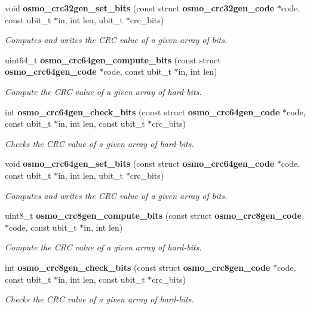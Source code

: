 \begin{DoxyCompactItemize}
void {\bf osmo\_\-crc32gen\_\-set\_\-bits} (const struct {\bf osmo\_\-crc32gen\_\-code} $\ast$code, const ubit\_\-t $\ast$in, int len, ubit\_\-t $\ast$crc\_\-bits)
\begin{DoxyCompactList}\small\item\em Computes and writes the CRC value of a given array of bits. \item\end{DoxyCompactList}\item 
uint64\_\-t {\bf osmo\_\-crc64gen\_\-compute\_\-bits} (const struct {\bf osmo\_\-crc64gen\_\-code} $\ast$code, const ubit\_\-t $\ast$in, int len)
\begin{DoxyCompactList}\small\item\em Compute the CRC value of a given array of hard-\/bits. \item\end{DoxyCompactList}\item 
int {\bf osmo\_\-crc64gen\_\-check\_\-bits} (const struct {\bf osmo\_\-crc64gen\_\-code} $\ast$code, const ubit\_\-t $\ast$in, int len, const ubit\_\-t $\ast$crc\_\-bits)
\begin{DoxyCompactList}\small\item\em Checks the CRC value of a given array of hard-\/bits. \item\end{DoxyCompactList}\item 
void {\bf osmo\_\-crc64gen\_\-set\_\-bits} (const struct {\bf osmo\_\-crc64gen\_\-code} $\ast$code, const ubit\_\-t $\ast$in, int len, ubit\_\-t $\ast$crc\_\-bits)
\begin{DoxyCompactList}\small\item\em Computes and writes the CRC value of a given array of bits. \item\end{DoxyCompactList}\item 
uint8\_\-t {\bf osmo\_\-crc8gen\_\-compute\_\-bits} (const struct {\bf osmo\_\-crc8gen\_\-code} $\ast$code, const ubit\_\-t $\ast$in, int len)
\begin{DoxyCompactList}\small\item\em Compute the CRC value of a given array of hard-\/bits. \item\end{DoxyCompactList}\item 
int {\bf osmo\_\-crc8gen\_\-check\_\-bits} (const struct {\bf osmo\_\-crc8gen\_\-code} $\ast$code, const ubit\_\-t $\ast$in, int len, const ubit\_\-t $\ast$crc\_\-bits)
\begin{DoxyCompactList}\small\item\em Checks the CRC value of a given array of hard-\/bits. \item\end{DoxyCompactList}\item 

\end{DoxyCompactItemize}
